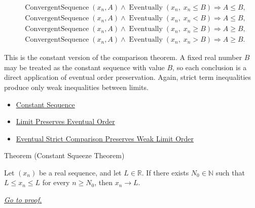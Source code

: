 \begin{remark*}
\[
\begin{aligned}
&\operatorname{ConvergentSequence}(x_n,A)
\land
\operatorname{Eventually}(x_n,\;x_n\le B)
\Longrightarrow A\le B,\\
&\operatorname{ConvergentSequence}(x_n,A)
\land
\operatorname{Eventually}(x_n,\;x_n<B)
\Longrightarrow A\le B,\\
&\operatorname{ConvergentSequence}(x_n,A)
\land
\operatorname{Eventually}(x_n,\;x_n\ge B)
\Longrightarrow A\ge B,\\
&\operatorname{ConvergentSequence}(x_n,A)
\land
\operatorname{Eventually}(x_n,\;x_n>B)
\Longrightarrow A\ge B.
\end{aligned}
\]
\end{remark*}

\begin{remark*}[Interpretation]
This is the constant version of the comparison theorem. A fixed real number
$B$ may be treated as the constant sequence with value $B$, so each conclusion
is a direct application of eventual order preservation. Again, strict term
inequalities produce only weak inequalities between limits.
\end{remark*}

\begin{dependencies}
\begin{itemize}
  \item \hyperref[def:constant-sequence]{Constant Sequence}
  \item \hyperref[thm:limit-preserves-eventual-order]{Limit Preserves Eventual Order}
  \item \hyperref[thm:eventual-strict-comparison-preserves-weak-limit-order]{Eventual Strict Comparison Preserves Weak Limit Order}
\end{itemize}
\end{dependencies}


\begin{theorembox}{Theorem (Constant Squeeze Theorem)}
\begin{theorem}
\label{thm:constant-squeeze-theorem}

Let $(x_n)$ be a real sequence, and let $L\in\mathbb{R}$. If there
exists $N_0\in\mathbb{N}$ such that $L\le x_n\le L$ for every
$n\ge N_0$, then $x_n\to L$.

\smallskip
\noindent
\hyperref[prf:constant-squeeze-theorem]{\textit{Go to proof.}}
\end{theorem}
\end{theorembox}

